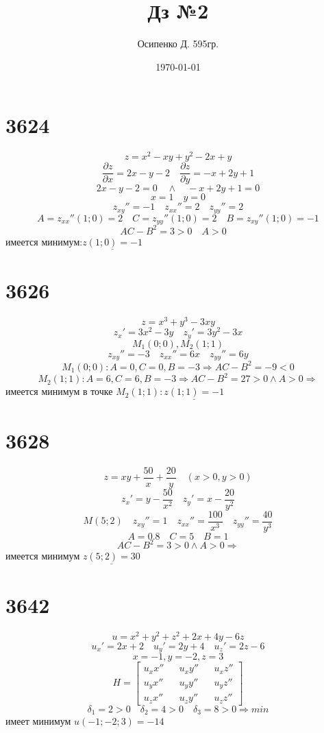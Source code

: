 \documentclass[a4paper, 12pt]{article}
\title{Дз №2}
\author{Осипенко Д. 595гр.}
\date{\today}
\begin{document}
\sffamily
\maketitle
\section*{3624}
\[
	z = x^2 - xy + y^2 - 2x + y
\]
\[
	\frac{\partial z}{\partial x} = 2x - y -2 \quad \frac{\partial z}{\partial y} = -x+2y+1
\]
\[
	2x - y -2 =0 \quad \land  \quad -x +2y + 1 = 0
\]
\[
	x =1 \quad y = 0
\]
\[
	z_{xy}''=-1 \quad z_{xx}'' = 2 \quad z_{yy}''=2
\]
\[
	A = z_{xx}''(1;0) = 2 \quad C = z_{yy}''(1;0) = 2 \quad B = z_{xy}''(1;0) = -1
\]
\[
	AC - B^2 = 3 > 0 \quad A > 0 \quad 
\]
имеется минимум:$ \underline{z(1;0)=-1} $ 
\section*{3626}
\[
	z = x^3 + y^3 - 3xy
\]
\[
	z_x' = 3x^2 - 3y \quad z_y' = 3y^2 - 3x
\]
\[
	M_1(0;0),M_2(1;1)
\]
\[
	z_{xy}''=-3 \quad z_{xx}''=6x\quad z_{yy}''=6y
\]
\[
	M_1(0;0):A=0,C=0,B=-3\Rightarrow AC-B^2 = -9 < 0
\]
\[
	M_2(1;1):A=6,C=6,B=-3\Rightarrow AC-B^2 = 27 > 0 \land A>0 \Rightarrow
\]
имеется минимум в точке $ M_2(1;1): \underline{z(1;1)=-1} $ 
\section*{3628}
\[
	z = xy + \frac{50}{x}+ \frac{20}{y} \quad (x>0,y>0)
\]
\[
	z_x' = y - \frac{50}{x^2} \quad z_y'=x - \frac{20}{y^2}
\]
\[
	M(5;2) \quad z_{xy}'' = 1\quad z_{xx}'' = \frac{100}{x^3}\quad z_{yy}'' = \frac{40}{y^3}
\]
\[
	A = 0.8\quad C = 5 \quad B=1
\]
\[
	AC-B^2 = 3 > 0 \land A>0 \Rightarrow
\]
имеется минимум $ \underline{z(5;2)=30} $ 
\section*{3642}
\[
	u = x^2 + y^2 + z^2 +2x + 4y - 6z
\]
\[
	u_x' = 2x + 2 \quad u_y'=2y + 4 \quad u_z'=2z -6
\]
\[
	x = -1,y=-2,z=3
\]
\[
	H = \begin{bmatrix}
	u_xx'' && u_xy'' && u_xz''\\
	u_yx'' && u_yy'' && u_yz''\\
	u_zx'' && u_zy'' && u_zz''
\end{bmatrix}	
\]
\[
	\delta_1 = 2 > 0 \quad \delta_2 = 4 > 0\quad \delta_3 = 8 > 0 \Rightarrow min
\]
имеет минимум $ u(-1;-2;3)=-14 $ 
\end{document}
